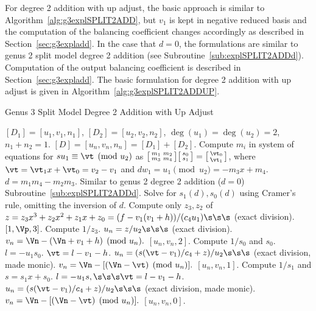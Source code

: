 For degree 2 addition with up adjust, the basic approach is similar to
Algorithm~\ref{alg:g3explSPLIT2ADD}, but $v_1$ is kept in negative reduced basis
and the computation of the balancing coefficient changes accordingly as
described in Section~\ref{sec:g3expladd}. In the case that $d=0$, the
formulations are similar to genus 2 split model degree 2 addition (see
Subroutine~\ref{sub:explSPLIT2ADDd}). Computation of the output balancing
coefficient is described in Section~\ref{sec:g3expladd}. The basic formulation
for degree 2 addition with up adjust is given in
Algorithm~\ref{alg:g3explSPLIT2ADDUP}.



\begin{algorithm}[H]
\caption{Genus 3 Split Model Degree 2 Addition with Up Adjust\label{alg:g3explSPLIT2ADDUP}}
\begin{algorithmic} [1]
\Require $[D_1] = [u_1,v_1,n_1]$, $[D_2] = [u_2,v_2,n_2]$, $\deg(u_1) = \deg(u_2) = 2$, $n_1 + n_2 = 1$.
\Ensure $[D] = [u_n,v_n,n_n] = [D_1] + [D_2] $.
\algrule
\vspace{-2pt}
\State Compute $m_i$ in system of equations for $su_1\equiv \vt \pmod{u_2}$ as $ \bigl[ \begin{smallmatrix} m_1 & m_2\\ m_3 & m_4\end{smallmatrix}\bigr] \bigl[ \begin{smallmatrix} s_0\\ s_1 \end{smallmatrix} \bigr ] = \bigl[ \begin{smallmatrix}\vt_0 \\  \vt_1\end{smallmatrix} \bigr ]$, where $\vt = \vt_1x + \vt_0 = v_2 - v_1$ and $dw_1 = u_1 \pmod{u_2} = -m_3x + m_4$.
\State $d = m_1m_4 - m_2m_3$.
    \State Similar to genus 2 degree 2 addition ($d=0$) Subroutine~\ref{sub:explSPLIT2ADDd}.
\EndIf
\State Solve for $s_1(d), s_0(d)$ using Cramer's rule, omitting the inversion of $d$.
\State Compute only $z_3, z_2$ of $z = z_3x^3 + z_2x^2 + z_1x + z_0 = (f - v_1(v_1 + h))/(c_4u_1) \s\s\s$ (exact division).  
         \Return $[1,\Vp,3]$.
        \Else \hspace{3pt} Compute $1/z_3$.
            \State $u_n = z/u_2 \s\s\s$ (exact division).
            \State $v_n = \Vn - (\Vn + v_1 + h) \pmod{u_n}.$
            \State \Return $[u_n,v_n,2]$.
        \EndIf
    \Else \hspace{3pt} Compute $1/s_0$ and $s_0$.
        \State $l = -u_1s_0$.
        \State $\vt = l - v_1 - h$.
        \State $u_n = (s(\vt - v_1)/c_4 + z)/u_2 \s\s\s$ (exact division, made monic).
        \State $v_n = \Vn - [(\Vn - \vt) \pmod{u_n}].$
        \State \Return $[u_n,v_n,1]$.
    \EndIf
\EndIf
\State Compute $1/s_1$ and $s = s_1x + s_0$.
\State $l = -u_1s, \s\s\s \vt = l - v_1 - h$.
\State $u_n = (s(\vt - v_1)/c_4 + z)/u_2 \s\s\s$ (exact division, made monic).
\State $v_n = \Vn - [(\Vn - \vt) \pmod{u_n}].$ 
\State \Return $[u_n,v_n,0]$.
\vspace{-2pt}
\end{algorithmic}
\end{algorithm}

